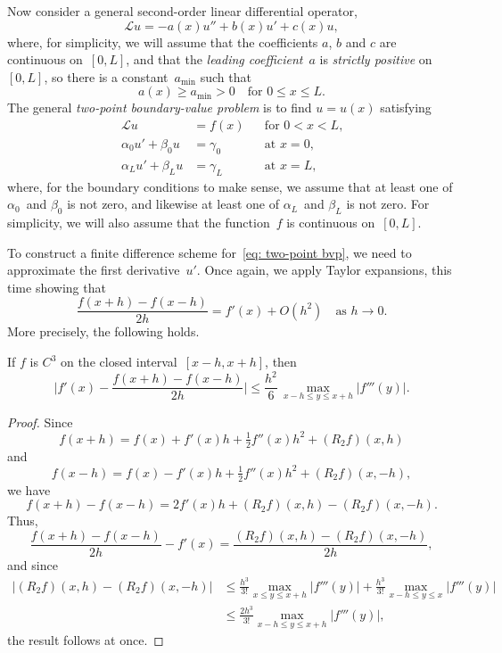 Now consider a general second-order linear differential operator,
\[
\mathcal{L}u=-a(x)u''+b(x)u'+c(x)u,
\]
where, for simplicity, we will assume that the coefficients $a$, $b$ and 
$c$ are continuous on~$[0,L]$, and that the \emph{leading coefficient}~$a$ is 
\emph{strictly positive} on~$[0,L]$, so there is a constant~$a_{\min}$ such that
\begin{equation}\label{eq: ellipticity 1d}
a(x)\ge a_{\min}>0\quad\text{for $0\le x\le L$.}
\end{equation}
The general \emph{two-point boundary-value problem} is to find $u=u(x)$ 
satisfying
\begin{equation}\label{eq: two-point bvp}
\begin{aligned}
\mathcal{L}u&=f(x)&&\text{for $0<x<L$,}\\
\alpha_0u'+\beta_0u&=\gamma_0&&\text{at $x=0$,}\\
\alpha_Lu'+\beta_Lu&=\gamma_L&&\text{at $x=L$,}
\end{aligned}
\end{equation}
where, for the boundary conditions to make sense, we assume that at least one 
of $\alpha_0$~and $\beta_0$ is not zero, and likewise at least one of  
$\alpha_L$~and $\beta_L$ is not zero.  For simplicity, we will also assume that 
the function~$f$ is continuous on~$[0,L]$.

To construct a finite difference scheme for~\eqref{eq: two-point bvp}, we need 
to approximate the first derivative~$u'$.  Once again, we apply Taylor 
expansions, this time showing that
\[
\frac{f(x+h)-f(x-h)}{2h}=f'(x)+O(h^2)\quad\text{as $h\to0$.}
\]
More precisely, the following holds.

\begin{theorem}
If $f$ is $C^3$ on the closed interval~$[x-h,x+h]$, then
\[
\biggl|f'(x)-\frac{f(x+h)-f(x-h)}{2h}\biggr|
	\le\frac{h^2}{6}\,\max_{x-h\le y\le x+h}|f'''(y)|.
\]
\end{theorem}
\begin{proof}
Since
\[
f(x+h)=f(x)+f'(x)h+\tfrac12f''(x)h^2+(R_2f)(x,h)
\]
and
\[
f(x-h)=f(x)-f'(x)h+\tfrac12f''(x)h^2+(R_2f)(x,-h),
\]
we have
\[
f(x+h)-f(x-h)=2f'(x)h+(R_2f)(x,h)-(R_2f)(x,-h).
\]
Thus,
\[
\frac{f(x+h)-f(x-h)}{2h}-f'(x)=\frac{(R_2f)(x,h)-(R_2f)(x,-h)}{2h},
\]
and since
\begin{align*}
\bigl|(R_2f)(x,h)-(R_2f)(x,-h)\bigr|
	&\le\frac{h^3}{3!}\max_{x\le y\le x+h}|f'''(y)|
 	   +\frac{h^3}{3!}\max_{x-h\le y\le x}|f'''(y)|\\
	&\le\frac{2h^3}{3!}\max_{x-h\le y\le x+h}|f'''(y)|,
\end{align*}
the result follows at once.
\end{proof}

